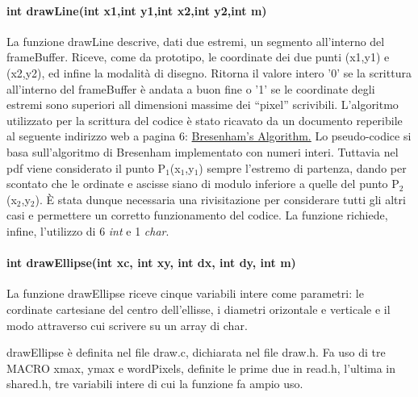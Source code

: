 \documentclass{article}
\begin{document}
		\paragraph{int drawLine(int x1,int y1,int x2,int y2,int m)}
                La funzione drawLine descrive, dati due estremi, un segmento all'interno del frameBuffer.
                \newline
                Riceve, come da prototipo, le coordinate dei due punti (x1,y1) e (x2,y2), ed infine la modalità di disegno.
                Ritorna il valore intero '0' se la scrittura all'interno del frameBuffer è andata a buon fine o '1' se le coordinate degli estremi sono superiori all dimensioni massime dei ``pixel'' scrivibili.
                L'algoritmo utilizzato per la scrittura del codice è stato ricavato da un documento reperibile al seguente indirizzo web a pagina 6:
                \href{http://www.idav.ucdavis.edu/education/GraphicsNotes/Bresenhams-Algorithm.pdf}{Bresenham's Algorithm.}\newline
                Lo pseudo-codice si basa sull'algoritmo di Bresenham implementato con numeri interi.
                Tuttavia nel pdf viene considerato il punto P$_{1}$(x$_{1}$,y$_{1}$) sempre l'estremo di partenza, dando per scontato che le ordinate e ascisse siano di modulo inferiore a quelle del punto P$_{2}$(x$_{2}$,y$_{2}$).
                È stata dunque necessaria una rivisitazione per considerare tutti gli altri casi e permettere un corretto funzionamento del codice.
                La funzione richiede, infine, l'utilizzo di 6 \textit{int} e 1 \textit{char}.
		\paragraph{int drawEllipse(int xc, int xy, int dx, int dy, int m)}
		La funzione drawEllipse riceve cinque variabili intere come parametri:
                le cordinate cartesiane del centro dell'ellisse, i diametri orizontale e verticale e il modo attraverso cui scrivere su un array di char.
		
		drawEllipse è definita nel file draw.c, dichiarata nel file draw.h.
                Fa uso di tre MACRO  xmax, ymax e wordPixels, definite le prime due in read.h, l'ultima in shared.h, tre variabili intere di cui la funzione fa ampio uso.
		
\end{document}
